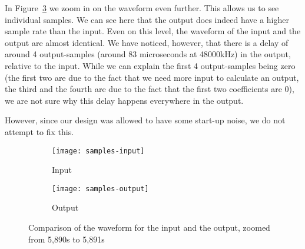 In Figure~\ref{fig:simulation:samples} we zoom in on the waveform even further.
This allows us to see individual samples.
We can see here that the output does indeed have a higher sample rate than the input.
Even on this level, the waveform of the input and the output are almost identical.
We have noticed, however, that there is a delay of around 4 output-samples (around 83 microseconds at 48000kHz) in the output, relative to the input.
While we can explain the first 4 output-samples being zero (the first two are due to the fact that we need more input to calculate an output, the third and the fourth are due to the fact that the first two coefficients are 0), we are not sure why this delay happens everywhere in the output.

However, since our design was allowed to have some start-up noise, we do not attempt to fix this.

\begin{figure}[H]
	\centering
	\begin{subfigure}[l]{\textwidth}
		\texttt{[image: samples-input]}
		\caption{Input}
		\label{fig:simulation:samples:before}
	\end{subfigure}

	\begin{subfigure}[l]{\textwidth}
		\texttt{[image: samples-output]}
		\caption{Output}
		\label{fig:simulation:samples:after}
	\end{subfigure}

	\caption{Comparison of the waveform for the input and the output, zoomed from 5,890s to 5,891s}
	\label{fig:simulation:samples}
\end{figure}
